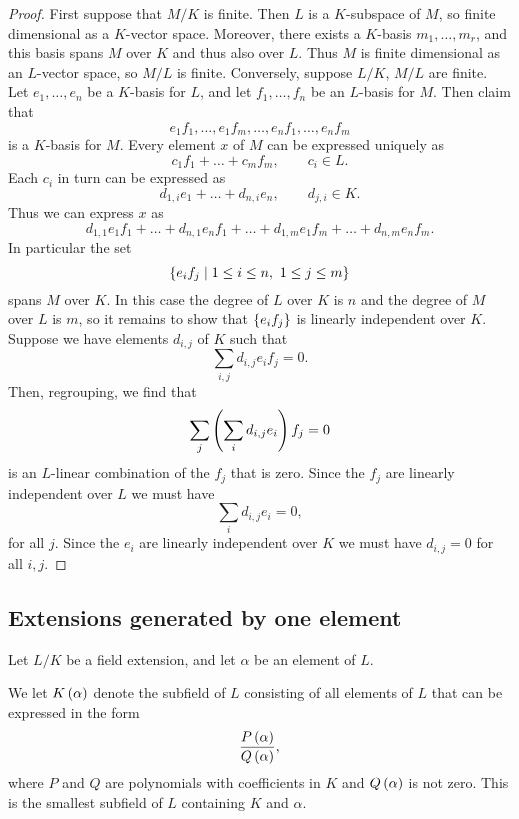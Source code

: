 \begin{proof}
First suppose that $ M / K $ is finite. Then $ L $ is a $ K $-subspace of $ M $, so finite dimensional as a $ K $-vector space. Moreover, there exists a $ K $-basis $ m_1, \dots, m_r $, and this basis spans $ M $ over $ K $ and thus also over $ L $. Thus $ M $ is finite dimensional as an $ L $-vector space, so $ M / L $ is finite. Conversely, suppose $ L / K $, $ M / L $ are finite. Let $ e_1, \dots, e_n $ be a $ K $-basis for $ L $, and let $ f_1, \dots, f_n $ be an $ L $-basis for $ M $. Then claim that
$$ e_1f_1, \dots, e_1f_m, \dots, e_nf_1, \dots, e_nf_m $$
is a $ K $-basis for $ M $. Every element $ x $ of $ M $ can be expressed uniquely as
$$ c_1f_1 + \dots + c_mf_m, \qquad c_i \in L. $$
Each $ c_i $ in turn can be expressed as
$$ d_{1, i}e_1 + \dots + d_{n, i}e_n, \qquad d_{j, i} \in K. $$
Thus we can express $ x $ as
$$ d_{1, 1}e_1f_1 + \dots + d_{n, 1}e_nf_1 + \dots + d_{1, m}e_1f_m + \dots + d_{n, m}e_nf_m. $$
In particular the set
$$ \left\{ e_if_j \mid 1 \le i \le n, \ 1 \le j \le m \right\} $$
spans $ M $ over $ K $. In this case the degree of $ L $ over $ K $ is $ n $ and the degree of $ M $ over $ L $ is $ m $, so it remains to show that $ \left\{ e_if_j \right\} $ is linearly independent over $ K $. Suppose we have elements $ d_{i, j} $ of $ K $ such that
$$ \sum_{i, j} d_{i, j}e_if_j = 0. $$
Then, regrouping, we find that
$$ \sum_j \left( \sum_i d_{i, j}e_i \right)f_j = 0 $$
is an $ L $-linear combination of the $ f_j $ that is zero. Since the $ f_j $ are linearly independent over $ L $ we must have
$$ \sum_i d_{i, j}e_i = 0, $$
for all $ j $. Since the $ e_i $ are linearly independent over $ K $ we must have $ d_{i, j} = 0 $ for all $ i, j $.
\end{proof}


\subsection{Extensions generated by one element}

Let $ L / K $ be a field extension, and let $ \alpha $ be an element of $ L $.

\begin{definition}
We let $ K\left( \alpha \right) $ denote the subfield of $ L $ consisting of all elements of $ L $ that can be expressed in the form
$$ \dfrac{P\left( \alpha \right)}{Q\left( \alpha \right)}, $$
where $ P $ and $ Q $ are polynomials with coefficients in $ K $ and $ Q\left( \alpha \right) $ is not zero. This is the smallest subfield of $ L $ containing $ K $ and $ \alpha $.
\end{definition}

